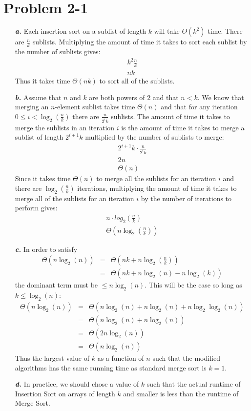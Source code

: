 \documentclass{article}
\begin{document}
\section*{Problem 2-1}

\noindent\begin{enumerate}
	\item[\textbf{\textit{a.}}] Each insertion sort on a sublist of length $k$ will take $\Theta(k^2)$ time. There are $\frac{n}{k}$ sublists. Multiplying the amount of time it takes to sort each sublist by the number of sublists gives:
	\begin{eqnarray*}
		k^2 \frac{n}{k} \\
		nk
	\end{eqnarray*}
	Thus it takes time $\Theta(nk)$ to sort all of the sublists.

	\item[\textbf{\textit{b.}}] Assume that $n$ and $k$ are both powers of 2 and that $n < k$. We know that merging an $n$-element sublist takes time $\Theta(n)$ and that for any iteration $0 \leq i < \log_2(\frac{n}{k})$ there are $\frac{n}{2^i k}$ sublists. The amount of time it takes to merge the sublists in an iteration $i$ is the amount of time it takes to merge a sublist of length $2^{i+1} k$ multiplied by the number of sublists to merge:
	\begin{eqnarray*}
		2^{i+1} k \cdot \frac{n}{2^i k} \\
		2n \\
		\Theta(n)
	\end{eqnarray*}
	Since it takes time $\Theta(n)$ to merge all the sublists for an iteration $i$ and there are $\log_2(\frac{n}{k})$ iterations, multiplying the amount of time it takes to merge all of the sublists for an iteration $i$ by the number of iterations to perform gives:
	\begin{eqnarray*}
		n \cdot log_2(\frac{n}{k}) \\
		\Theta(n \log_2(\frac{n}{k}))
	\end{eqnarray*}

	\item[\textbf{\textit{c.}}] In order to satisfy
	\begin{eqnarray*}
		\Theta(n \log_2(n)) & = & \Theta(nk + n \log_2 (\frac{n}{k})) \\
		 & = & \Theta(nk + n \log_2 (n) - n \log_2 (k))
	\end{eqnarray*}
	the dominant term must be $\leq n \log_2(n)$.  This will be the case so long as $k \leq \log_2(n)$:
	\begin{eqnarray*}
		\Theta(n \log_2(n)) & = & \Theta(n \log_2(n) + n \log_2(n) + n \log_2 \log_2 (n)) \\
		 & = & \Theta(n \log_2(n) + n \log_2(n)) \\
		 & = & \Theta(2n \log_2(n)) \\
		 & = & \Theta(n \log_2(n))
	\end{eqnarray*}
	Thus the largest value of $k$ as a function of $n$ such that the modified algorithms has the same running time as standard merge sort is $k = 1$.

	\item[\textbf{\textit{d.}}] In practice, we should chose a value of $k$ such that the actual runtime of Insertion Sort on arrays of length $k$ and smaller is less than the runtime of Merge Sort.
\end{enumerate}
\end{document}

